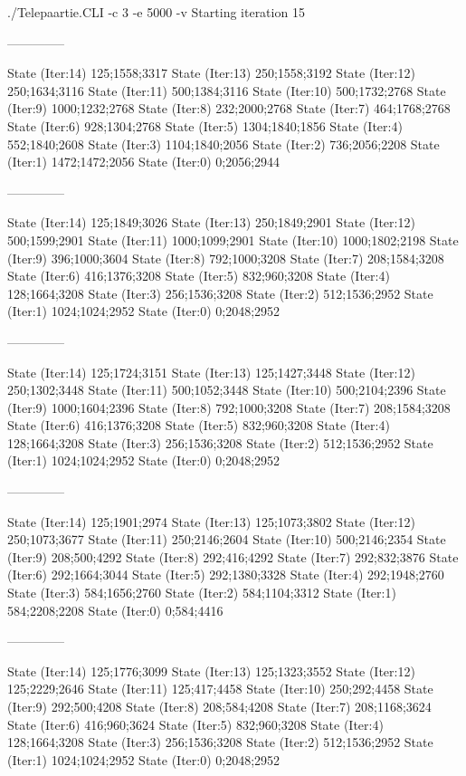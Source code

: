 \documentclass[a4paper,10pt,ngerman]{scrartcl}
\begin{document}
\begin{lstcs}
./Telepaartie.CLI -c 3 -e 5000 -v
Starting iteration 15

--------------

State (Iter:14) {125;1558;3317}
State (Iter:13) {250;1558;3192}
State (Iter:12) {250;1634;3116}
State (Iter:11) {500;1384;3116}
State (Iter:10) {500;1732;2768}
State (Iter:9) {1000;1232;2768}
State (Iter:8) {232;2000;2768}
State (Iter:7) {464;1768;2768}
State (Iter:6) {928;1304;2768}
State (Iter:5) {1304;1840;1856}
State (Iter:4) {552;1840;2608}
State (Iter:3) {1104;1840;2056}
State (Iter:2) {736;2056;2208}
State (Iter:1) {1472;1472;2056}
State (Iter:0) {0;2056;2944}

--------------

State (Iter:14) {125;1849;3026}
State (Iter:13) {250;1849;2901}
State (Iter:12) {500;1599;2901}
State (Iter:11) {1000;1099;2901}
State (Iter:10) {1000;1802;2198}
State (Iter:9) {396;1000;3604}
State (Iter:8) {792;1000;3208}
State (Iter:7) {208;1584;3208}
State (Iter:6) {416;1376;3208}
State (Iter:5) {832;960;3208}
State (Iter:4) {128;1664;3208}
State (Iter:3) {256;1536;3208}
State (Iter:2) {512;1536;2952}
State (Iter:1) {1024;1024;2952}
State (Iter:0) {0;2048;2952}

--------------

State (Iter:14) {125;1724;3151}
State (Iter:13) {125;1427;3448}
State (Iter:12) {250;1302;3448}
State (Iter:11) {500;1052;3448}
State (Iter:10) {500;2104;2396}
State (Iter:9) {1000;1604;2396}
State (Iter:8) {792;1000;3208}
State (Iter:7) {208;1584;3208}
State (Iter:6) {416;1376;3208}
State (Iter:5) {832;960;3208}
State (Iter:4) {128;1664;3208}
State (Iter:3) {256;1536;3208}
State (Iter:2) {512;1536;2952}
State (Iter:1) {1024;1024;2952}
State (Iter:0) {0;2048;2952}

--------------

State (Iter:14) {125;1901;2974}
State (Iter:13) {125;1073;3802}
State (Iter:12) {250;1073;3677}
State (Iter:11) {250;2146;2604}
State (Iter:10) {500;2146;2354}
State (Iter:9) {208;500;4292}
State (Iter:8) {292;416;4292}
State (Iter:7) {292;832;3876}
State (Iter:6) {292;1664;3044}
State (Iter:5) {292;1380;3328}
State (Iter:4) {292;1948;2760}
State (Iter:3) {584;1656;2760}
State (Iter:2) {584;1104;3312}
State (Iter:1) {584;2208;2208}
State (Iter:0) {0;584;4416}

--------------

State (Iter:14) {125;1776;3099}
State (Iter:13) {125;1323;3552}
State (Iter:12) {125;2229;2646}
State (Iter:11) {125;417;4458}
State (Iter:10) {250;292;4458}
State (Iter:9) {292;500;4208}
State (Iter:8) {208;584;4208}
State (Iter:7) {208;1168;3624}
State (Iter:6) {416;960;3624}
State (Iter:5) {832;960;3208}
State (Iter:4) {128;1664;3208}
State (Iter:3) {256;1536;3208}
State (Iter:2) {512;1536;2952}
State (Iter:1) {1024;1024;2952}
State (Iter:0) {0;2048;2952}


\end{lstcs}
\end{document}
